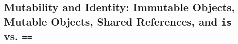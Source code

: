 \subsection{Mutability and Identity: Immutable Objects, Mutable Objects, Shared References, and \texttt{is} vs. \texttt{==}}
